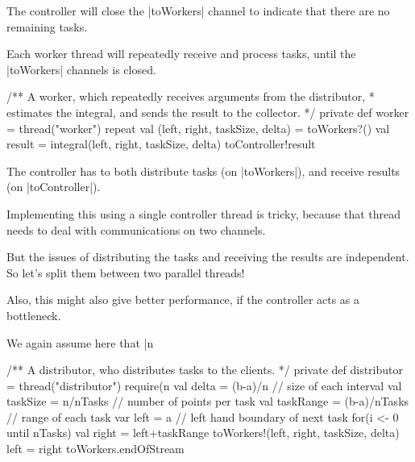 
\begin{slide}

The controller will close the |toWorkers| channel to indicate that there are
no remaining tasks.

Each  worker thread will repeatedly receive and process tasks, until the
|toWorkers|  channels is closed.  
%
\begin{scala}
  /** A worker, which repeatedly receives arguments from the distributor,
    * estimates the integral, and sends the result to the collector. */
  private def worker = thread("worker"){
    repeat{
      val (left, right, taskSize, delta) = toWorkers?() 
      val result = integral(left, right, taskSize, delta)
      toController!result
    }
  }
\end{scala}
\end{slide}


\begin{slide}

The controller has to both distribute tasks (on |toWorkers|), and receive
results (on |toController|).

Implementing this using a single controller thread is tricky, because that
thread needs to deal with communications on two channels. 

But the issues of distributing the tasks and receiving the results are
independent.  So let's split them between two parallel threads!  

Also, this might also give better performance, if the controller acts as a
bottleneck.
\end{slide}


\begin{slide}

We again assume here that |n%
\begin{scala}
  /** A distributor, who distributes tasks to the clients. */
  private def distributor = thread("distributor"){
    require(n%
    val delta = (b-a)/n               // size of each interval
    val taskSize = n/nTasks          // number of points per task
    val taskRange = (b-a)/nTasks // range of each task
    var left = a                      // left hand boundary of next task
    for(i <- 0 until nTasks){
      val right = left+taskRange
      toWorkers!(left, right, taskSize, delta)
      left = right
    }
    toWorkers.endOfStream
  }
\end{scala}
\end{slide}


